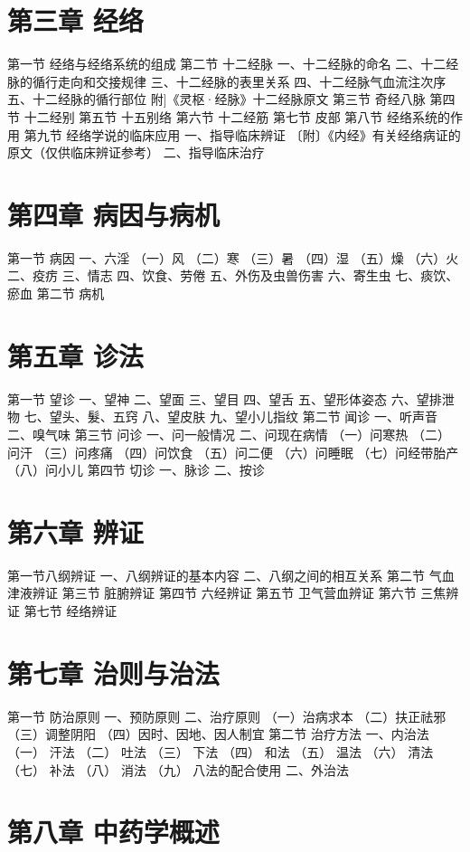 \documentclass[a4paper,12pt,UTF8,twoside]{ctexbook}
\begin{document}
\chapter{第三章 经络}
第一节 经络与经络系统的组成
第二节 十二经脉
一、十二经脉的命名
二、十二经脉的循行走向和交接规律
三、十二经脉的表里关系
四、十二经脉气血流注次序
五、十二经脉的循行部位
附]《灵枢·经脉》十二经脉原文
第三节 奇经八脉
第四节 十二经别
第五节 十五别络
第六节 十二经筋
第七节 皮部
第八节 经络系统的作用
第九节 经络学说的临床应用
一、指导临床辨证
〔附〕《内经》有关经络病证的原文（仅供临床辨证参考）
二、指导临床治疗

\chapter{第四章 病因与病机}
第一节 病因
一、六淫
（一）风
（二）寒
（三）暑
（四）湿
（五）燥
（六）火
二、疫疠
三、情志
四、饮食、劳倦
五、外伤及虫兽伤害
六、寄生虫
七、痰饮、瘀血
第二节 病机

\chapter{第五章 诊法}
第一节 望诊
一、望神
二、望面
三、望目
四、望舌
五、望形体姿态
六、望排泄物
七、望头、髮、五窍
八、望皮肤
九、望小儿指纹
第二节 闻诊
一、听声音
二、嗅气味
第三节 问诊
一、问一般情况
二、问现在病情
（一）问寒热
（二） 问汗
（三）问疼痛
（四）问饮食
（五）问二便
（六）问睡眠
（七）问经带胎产
（八）问小儿
第四节 切诊
一、脉诊
二、按诊

\chapter{第六章 辨证}
第一节八纲辨证
一、八纲辨证的基本内容
二、八纲之间的相互关系
第二节 气血津液辨证
第三节 脏腑辨证
第四节 六经辨证
第五节 卫气营血辨证
第六节 三焦辨证
第七节 经络辨证

\chapter{第七章 治则与治法}
第一节 防治原则
一、预防原则
二、治疗原则
（一）治病求本
（二）扶正祛邪
（三）调整阴阳
（四）因时、因地、因人制宜
第二节 治疗方法
一、内治法
（一） 汗法
（二） 吐法
（三） 下法
（四） 和法
（五） 温法
（六） 清法
（七） 补法
（八） 消法
（九） 八法的配合使用
二、外治法
\chapter{第八章 中药学概述}
\end{document}
